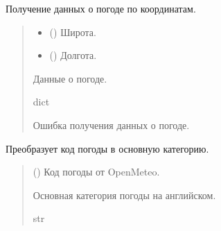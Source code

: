 \documentclass[letterpaper,10pt,russian]{sphinxmanual}
\begin{document}
\begin{fulllineitems}
\label{\detokenize{Project_weather:app.weather.controller.get_weather_from_openmeteo}}
\pysigstartsignatures
\pysiglinewithargsret
{}
{\sphinxparamcomma {}}
{}
\pysigstopsignatures
\sphinxAtStartPar
Получение данных о погоде по координатам.
\begin{quote}\begin{description}
\begin{itemize}
\item {} 
\sphinxAtStartPar
{} () \textendash{} Широта.

\item {} 
\sphinxAtStartPar
{} () \textendash{} Долгота.

\end{itemize}

\sphinxAtStartPar
Данные о погоде.

\sphinxAtStartPar
dict

\sphinxAtStartPar
{} \textendash{} Ошибка получения данных о погоде.

\end{description}\end{quote}

\end{fulllineitems}


\begin{fulllineitems}
\label{\detokenize{Project_weather:app.weather.controller.get_weather_main}}
\pysigstartsignatures
\pysiglinewithargsret
{}
{}
{}
\pysigstopsignatures
\sphinxAtStartPar
Преобразует код погоды в основную категорию.
\begin{quote}\begin{description}
\sphinxAtStartPar
{} () \textendash{} Код погоды от Open\sphinxhyphen{}Meteo.

\sphinxAtStartPar
Основная категория погоды на английском.

\sphinxAtStartPar
str

\end{description}\end{quote}

\end{fulllineitems}
\end{document}
